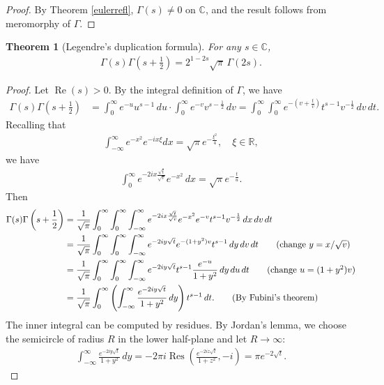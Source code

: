\documentclass{article}
\numberwithin{equation}{section}
\newcommand{\bbC}{\mathbb{C}}
\newcommand{\bbR}{\mathbb{R}}
\DeclareMathOperator{\re}{Re}
\DeclareMathOperator{\res}{Res}
\theoremstyle{plain}
\newtheorem{theorem}{Theorem}[section]
\theoremstyle{definition}
\begin{document}
\begin{proof}
By Theorem \ref{eulerrefl}, $\Gamma(s)\neq 0$ on $\bbC$, and the result follows from meromorphy of $\Gamma$.
\end{proof}
\begin{theorem}[Legendre's duplication formula]
For any $s\in\bbC$,
\begin{align*}
	\Gamma(s)\Gamma\left(s+\frac{1}{2}\right)=2^{1-2s}\sqrt{\pi}\,\Gamma(2s).
\end{align*}
\end{theorem}
\begin{proof}
Let $\re(s)>0$. By the integral definition of $\Gamma$, we have
\begin{align*}
	\Gamma(s)\Gamma\left(s+\frac{1}{2}\right)&=\int_0^\infty e^{-u}u^{s-1}\,du\cdot\int_0^\infty e^{-v}v^{s-\frac{1}{2}}\,dv=\int_0^\infty\int_0^\infty e^{-(v+\frac{t}{v})}t^{s-1}v^{-\frac{1}{2}}\,dv\,dt\tag{let $u=t/v$}.
\end{align*}
Recalling that
\begin{align*}
	\int_{-\infty}^\infty e^{-x^2}e^{-ix\xi} dx=\sqrt{\pi}e^{-\frac{\xi^2}{4}},\quad\xi\in\bbR,
\end{align*}
we have
\begin{align*}
	\int_0^\infty e^{-2ix\frac{\sqrt{t}}{\sqrt{v}}}e^{-x^2}\,dx=\sqrt{\pi}e^{-\frac{t}{u}}.
\end{align*}
Then
\begin{align*}
\Gamma(s)\Gamma\left(s+\frac{1}{2}\right)&=\frac{1}{\sqrt{\pi}}\int_0^\infty\int_0^\infty \int_{-\infty}^\infty e^{-2ix\frac{\sqrt{t}}{\sqrt{v}}}e^{-x^2}e^{-v}t^{s-1}v^{-\frac{1}{2}}\,dx\,dv\,dt\\
&=\frac{1}{\sqrt{\pi}}\int_0^\infty\int_0^\infty \int_{-\infty}^\infty e^{-2iy\sqrt{t}}e^{-(1+y^2)v}t^{s-1}\,dy\,dv\,dt\tag{change $y=x/\sqrt{v}$}\\
&=\frac{1}{\sqrt{\pi}}\int_0^\infty\int_0^\infty \int_{-\infty}^\infty e^{-2iy\sqrt{t}}t^{s-1}\frac{e^{-u}}{1+y^2}\,dy\,du\,dt\tag{change $u=(1+y^2)v$}\\
&=\frac{1}{\sqrt{\pi}}\int_0^\infty\left(\int_{-\infty}^\infty \frac{e^{-2iy\sqrt{t}}}{1+y^2}\,dy\right)t^{s-1}\,dt.\tag{By Fubini's theorem}
\end{align*}
The inner integral can be computed by residues. By Jordan's lemma, we choose the semicircle of radius $R$ in the lower half-plane and let $R\to\infty$:
\begin{align*}
\int_{-\infty}^\infty \frac{e^{-2iy\sqrt{t}}}{1+y^2}\,dy=-2\pi i\res\left(\frac{e^{-2iz\sqrt{t}}}{1+z^2},-i\right)=\pi e^{-2\sqrt{t}}.

\end{align*}
\end{proof}
\end{document}
